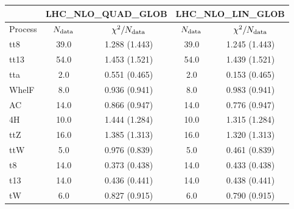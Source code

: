 \documentclass{article}
\begin{document}
\begin{table}[H]
\centering
\begin{tabular}{|l|c|c|c|c|}
\hline
& \multicolumn{2}{c|}{LHC_NLO_QUAD_GLOB}& \multicolumn{2}{c|}{LHC_NLO_LIN_GLOB}\\ \hline
Process  & $N_{\rm data}$ & $\chi^2/N_{\rm data}$ & $N_{\rm data}$ & $\chi^2/N_{\rm data}$\\ \hline
tt8 & 39.0                         & 1.288                             (1.443) & 39.0                         & 1.245                             (1.443) \\ \hline
tt13 & 54.0                         & 1.453                             (1.521) & 54.0                         & 1.439                             (1.521) \\ \hline
tta & 2.0                         & 0.551                             (0.465) & 2.0                         & 0.153                             (0.465) \\ \hline
WhelF & 8.0                         & 0.936                             (0.941) & 8.0                         & 0.983                             (0.941) \\ \hline
AC & 14.0                         & 0.866                             (0.947) & 14.0                         & 0.776                             (0.947) \\ \hline
4H & 10.0                         & 1.444                             (1.284) & 10.0                         & 1.315                             (1.284) \\ \hline
ttZ & 16.0                         & 1.385                             (1.313) & 16.0                         & 1.320                             (1.313) \\ \hline
ttW & 5.0                         & 0.976                             (0.839) & 5.0                         & 0.461                             (0.839) \\ \hline
t8 & 14.0                         & 0.373                             (0.438) & 14.0                         & 0.433                             (0.438) \\ \hline
t13 & 14.0                         & 0.436                             (0.441) & 14.0                         & 0.438                             (0.441) \\ \hline
tW & 6.0                         & 0.827                             (0.915) & 6.0                         & 0.790                             (0.915) \\ \hline

\end{tabular}
\end{table}
\end{document}
